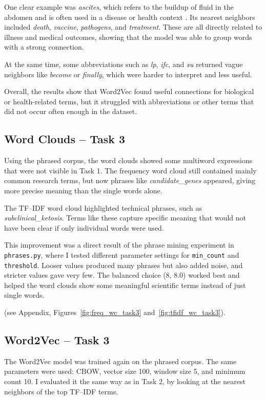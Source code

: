 \documentclass[11pt]{article}
\begin{document}
One clear example was \textit{ascites}, which refers to the buildup of fluid in the abdomen and is often 
used in a disease or health context \citep{clevelandclinic2025ascites}. Its nearest neighbors included 
\textit{death}, \textit{vaccine}, \textit{pathogens}, and \textit{treatment}. These are all directly related 
to illness and medical outcomes, showing that the model was able to group words with a strong connection.  

At the same time, some abbreviations such as 
\textit{lp}, \textit{ifc}, and \textit{su} returned vague neighbors like \textit{become} or \textit{finally}, 
which were harder to interpret and less useful.  

Overall, the results show that Word2Vec found useful connections for biological or health-related 
terms, but it struggled with abbreviations or other terms that did not occur often enough in the dataset.

\subsection{Word Clouds -- Task 3}
Using the phrased corpus, the word clouds showed some multiword expressions that were not visible in Task 1. 
The frequency word cloud still contained mainly common research terms, but now phrases like 
\textit{candidate\_genes} appeared, giving more precise meaning than the single words alone.  

The TF--IDF word cloud highlighted technical phrases, such as \textit{subclinical\_ketosis}. 
Terms like these capture specific meaning that would not have been clear if only individual words were used.  

This improvement was a direct result of the phrase mining experiment in \texttt{phrases.py}, where I tested 
different parameter settings for \texttt{min\_count} and \texttt{threshold}. Looser values produced many 
phrases but also added noise, and stricter values gave very few. The balanced choice (8, 8.0) worked best 
and helped the word clouds show some meaningful scientific terms instead of just single words.  

(see Appendix, Figures~\ref{fig:freq_wc_task3} and~\ref{fig:tfidf_wc_task3}).  

\subsection{Word2Vec -- Task 3}
The Word2Vec model was trained again on the phrased corpus. The same parameters were used: 
CBOW, vector size 100, window size 5, and minimum count 10. I evaluated it the same way as 
in Task 2, by looking at the nearest neighbors of the top TF--IDF terms.  
\end{document}
